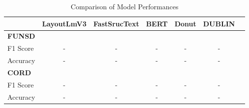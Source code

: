 \begin{table}[htbp]
  \centering
  \caption{Comparison of Model Performances}
  \begin{tabular}{lcccccc}
    \toprule
    & \textbf{LayoutLmV3} & \textbf{FastSrucText} & \textbf{BERT} & \textbf{Donut} & \textbf{DUBLIN} \\
    \midrule
    \textbf{FUNSD} \\
    F1 Score & - & - & - & - & - \\
    Accuracy & - & - & - & - & - \\
    \addlinespace
    \textbf{CORD} \\
    F1 Score & - & - & - & - & - \\
    Accuracy & - & - & - & - & - \\
    \bottomrule
  \end{tabular}
\end{table}

